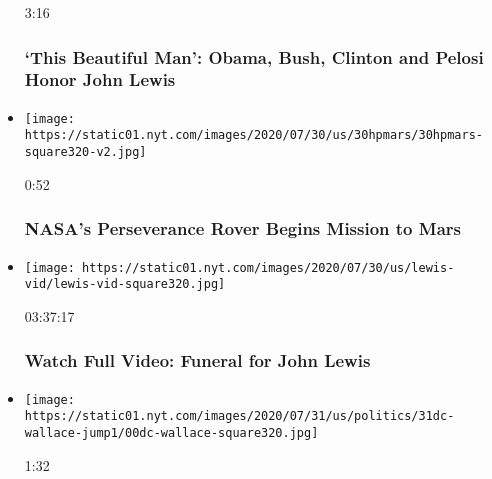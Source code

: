 \begin{itemize}
  3:16

  \hypertarget{this-beautiful-man-obama-bush-clinton-and-pelosi-honor-john-lewis}{%
  \subsubsection{`This Beautiful Man': Obama, Bush, Clinton and Pelosi
  Honor John
  Lewis}\label{this-beautiful-man-obama-bush-clinton-and-pelosi-honor-john-lewis}}
\item
  \href{https://www.nytimes.com/video/us/100000007264604/nasas-perseverance-mars.html?action=click\&module=video-series-bar\&region=header\&pgtype=Article\&playlistId=video/latest-video}{}

  \texttt{[image: https://static01.nyt.com/images/2020/07/30/us/30hpmars/30hpmars-square320-v2.jpg]}

  0:52

  \hypertarget{nasas-perseverance-rover-begins-mission-to-mars}{%
  \subsubsection{NASA's Perseverance Rover Begins Mission to
  Mars}\label{nasas-perseverance-rover-begins-mission-to-mars}}
\item
  \href{https://www.nytimes.com/video/us/politics/100000007264379/john-lewis-funeral.html?action=click\&module=video-series-bar\&region=header\&pgtype=Article\&playlistId=video/latest-video}{}

  \texttt{[image: https://static01.nyt.com/images/2020/07/30/us/lewis-vid/lewis-vid-square320.jpg]}

  03:37:17

  \hypertarget{watch-full-video-funeral-for-john-lewis}{%
  \subsubsection{Watch Full Video: Funeral for John
  Lewis}\label{watch-full-video-funeral-for-john-lewis}}
\item
  \href{https://www.nytimes.com/video/us/politics/100000007255898/trump-george-wallace-rhetoric.html?action=click\&module=video-series-bar\&region=header\&pgtype=Article\&playlistId=video/latest-video}{}

  \texttt{[image: https://static01.nyt.com/images/2020/07/31/us/politics/31dc-wallace-jump1/00dc-wallace-square320.jpg]}

  1:32

  \hypertarget{trump-and-george-wallace-share-a-speaking-style}{%
}
\end{itemize}

